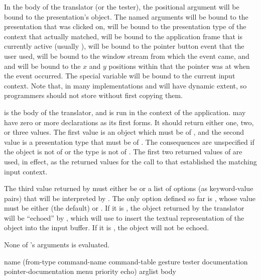 In the body of the translator (or the tester), the positional 
argument will be bound to the presentation's object.  The named arguments
 will be bound to the presentation that was clicked on,
 will be bound to the presentation type of the context that
actually matched,  will be bound to the application frame that is
currently active (usually ),  will be bound
to the pointer button event that the user used,  will be bound to
the window stream from which the event came, and  and  will be
bound to the $x$ and $y$ positions within  that the pointer was at
when the event occurred.  The special variable  will be
bound to the current input context.  Note that, in many implementations
 and  will have dynamic extent, so
programmers should not store without first copying them.

 is the body of the translator, and is run in the context of the
application.   may have zero or more declarations as its first forms.
It should return either one, two, or three values.  The first value is an object
which must be  of , and the second value is
a presentation type that must be  of .
The consequences are unspecified if the object is not  of
 or the type is not  of .
The first two returned values of  are used, in effect, as the returned
values for the call to  that established the matching input context.

The third value returned by  must either be  or a list of
options (as keyword-value pairs) that will be interpreted by .  The
only option defined so far is , whose value must be either 
(the default) or .  If it is , the object returned by the
translator will be ``echoed'' by , which will use
 to insert the textual representation of the
object into the input buffer.  If it is , the object will not be
echoed.

None of 's arguments is evaluated.


 {name 
                                                       (from-type command-name command-table
                                                        \key gesture tester
                                                             documentation pointer-documentation 
                                                             menu priority echo)
                                                       arglist
                                                       \body body}

